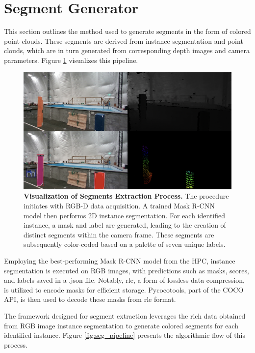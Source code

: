 \section{Segment Generator}

This section outlines the method used to generate segments in the form of colored point clouds. These segments are derived from instance segmentation and point clouds, which are in turn generated from corresponding depth images and camera parameters. Figure \ref{fig:seg_vis} visualizes this pipeline.

\begin{figure}[H]
    \centering  
    \includegraphics[width=1.0\textwidth]{Pictures/segments_extractor.png}
    \caption{\textbf{Visualization of Segments Extraction Process.} The procedure initiates with RGB-D data acquisition. A trained Mask R-CNN model then performs 2D instance segmentation. For each identified instance, a mask and label are generated, leading to the creation of distinct segments within the camera frame. These segments are subsequently color-coded based on a palette of seven unique labels.}
    \label{fig:seg_vis}
\end{figure}

Employing the best-performing Mask R-CNN model from the HPC, instance segmentation is executed on RGB images, with predictions such as masks, scores, and labels saved in a .json file. Notably, \acrfull{rle}, a form of lossless data compression, is utilized to encode masks for efficient storage. Pycocotools, part of the COCO API\cite{COCOAPI}, is then used to decode these masks from \acrshort{rle} format.

The framework designed for segment extraction leverages the rich data obtained from RGB image instance segmentation to generate colored segments for each identified instance. Figure \ref{fig:seg_pipeline} presents the algorithmic flow of this process.

